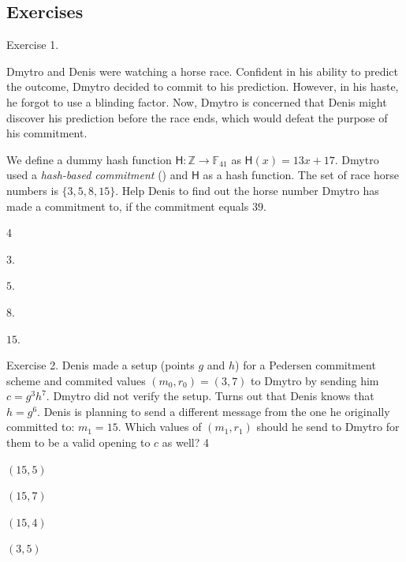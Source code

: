 \documentclass[../../book]{subfiles}
\begin{document}
\subsection{Exercises}

\vspace{-1mm}

\begin{xexercise}
    {Exercise 1.}
    {Dmytro and Denis were watching a horse race. Confident in
    his ability to predict the outcome, Dmytro decided to commit to his
    prediction. However, in his haste, he forgot to use a blinding factor. Now,
    Dmytro is concerned that Denis might discover his prediction before the race
    ends, which would defeat the purpose of his commitment.
    
    We define a dummy hash function $\mathsf{H}: \mathbb{Z} \to \mathbb{F}_{41}$ as $\mathsf{H}(x)
    = 13x+17$. Dmytro used a \textit{hash-based commitment} () and $\mathsf{H}$ as a hash
    function. The set of race horse numbers is $\{3, 5, 8, 15\}$. Help Denis to
    find out the horse number Dmytro has made a commitment to, if the
    commitment equals $39$.}
    {4}
    {
        \item $3$.
        \item $5$.
        \item $8$.
        \item $15$.
    }
\end{xexercise}

\begin{xexercise}
    {Exercise 2.}
    {Denis made a setup (points $g$ and $h$) for a Pedersen
    commitment scheme and commited values $(m_0, r_0) = (3, 7)$ to Dmytro by sending him
    $c = g^3h^7$. Dmytro did not verify the setup. Turns out that Denis knows
    that $h=g^6$. Denis is planning to send a different message from the one he
    originally committed to: $m_1 = 15$. Which values of $(m_1, r_1)$ should he send
    to Dmytro for them to be a valid opening to $c$ as well?}
    {4}
    {
        \item $(15, 5)$
        \item $(15, 7)$
        \item $(15, 4)$
        \item $(3, 5)$
    }
\end{xexercise}
\end{document}

